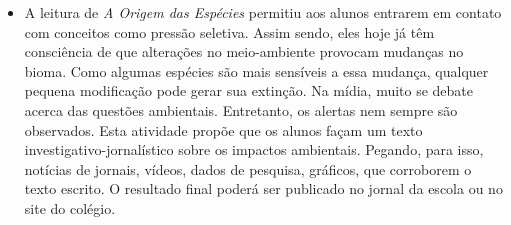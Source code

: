 \documentclass[11pt]{extarticle}
\begin{document}
\begin{comment}
``Em relação ao campo jornalístico-midiático, espera-se que os jovens que
chegam ao Ensino Médio sejam capazes de: compreender os fatos e circunstâncias
principais relatados; perceber a impossibilidade de neutralidade absoluta no
relato de fatos; adotar procedimentos básicos de checagem de veracidade de
informação; identificar diferentes pontos de vista diante de questões polêmicas
de relevância social; avaliar argumentos utilizados e posicionar-se em relação
a eles de forma ética; identificar e denunciar discursos de ódio e que envolvam
desrespeito aos Direitos Humanos; e produzir textos jornalísticos variados,
tendo em vista seus contextos de produção e características dos gêneros. Eles
também devem ter condições de analisar estratégias linguístico-discursivas
utilizadas pelos textos publicitários e de refletir sobre necessidades
e condições de consumo.

No Ensino Médio, os jovens precisam aprofundar a análise dos interesses que
movem o campo jornalístico midiático, da relação entre informação e opinião,
com destaque para o fenômeno da pós-verdade, consolidar o desenvolvimento de
habilidades, apropriar-se de mais procedimentos envolvidos na curadoria de
informações, ampliar o contato com projetos editoriais independentes e tomar
consciência de que uma mídia independente e plural é condição indispensável
para a democracia.

Como já destacado, as práticas que têm lugar nas redes sociais têm tratamento
ampliado.'' (BNCC, p. 494-495)
\end{comment}

\begin{itemize} \item A leitura de \emph{A Origem das Espécies} permitiu aos
      alunos entrarem em contato com conceitos como pressão seletiva. Assim
      sendo, eles hoje já têm consciência de que alterações no meio-ambiente
      provocam mudanças no bioma. Como algumas espécies são mais sensíveis
      a essa mudança, qualquer pequena modificação pode gerar sua
      extinção. Na mídia, muito se debate acerca das questões ambientais.
      Entretanto, os alertas nem sempre são observados. Esta atividade propõe
      que os alunos façam um texto investigativo-jornalístico sobre os impactos
      ambientais. Pegando, para isso, notícias de jornais, vídeos, dados de
      pesquisa, gráficos, que corroborem o texto escrito. O resultado final
      poderá ser publicado no jornal da escola ou no site do colégio.
  \end{itemize}
\end{document}
